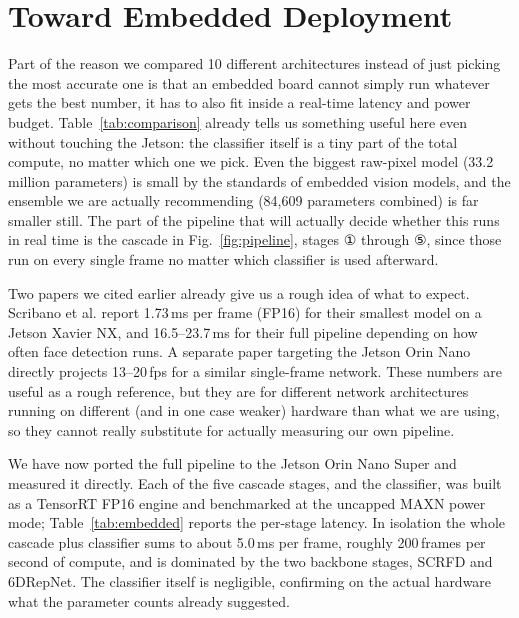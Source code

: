 \documentclass[conference]{IEEEtran}
\begin{document}
\section{Toward Embedded Deployment}
\label{sec:embedded}

Part of the reason we compared 10 different architectures instead of just picking the most accurate one is that an embedded board cannot simply run whatever gets the best number, it has to also fit inside a real-time latency and power budget. Table~\ref{tab:comparison} already tells us something useful here even without touching the Jetson: the classifier itself is a tiny part of the total compute, no matter which one we pick. Even the biggest raw-pixel model (33.2 million parameters) is small by the standards of embedded vision models, and the ensemble we are actually recommending (84,609 parameters combined) is far smaller still. The part of the pipeline that will actually decide whether this runs in real time is the cascade in Fig.~\ref{fig:pipeline}, stages ① through ⑤, since those run on every single frame no matter which classifier is used afterward.

Two papers we cited earlier already give us a rough idea of what to expect. Scribano et al. \cite{b_scribano} report 1.73\,ms per frame (FP16) for their smallest model on a Jetson Xavier NX, and 16.5--23.7\,ms for their full pipeline depending on how often face detection runs. A separate paper targeting the Jetson Orin Nano directly \cite{b_multiregion} projects 13--20\,fps for a similar single-frame network. These numbers are useful as a rough reference, but they are for different network architectures running on different (and in one case weaker) hardware than what we are using, so they cannot really substitute for actually measuring our own pipeline.

We have now ported the full pipeline to the Jetson Orin Nano Super and measured it directly. Each of the five cascade stages, and the classifier, was built as a TensorRT FP16 engine and benchmarked at the uncapped MAXN power mode; Table~\ref{tab:embedded} reports the per-stage latency. In isolation the whole cascade plus classifier sums to about 5.0\,ms per frame, roughly 200\,frames per second of compute, and is dominated by the two backbone stages, SCRFD and 6DRepNet. The classifier itself is negligible, confirming on the actual hardware what the parameter counts already suggested.
\end{document}
